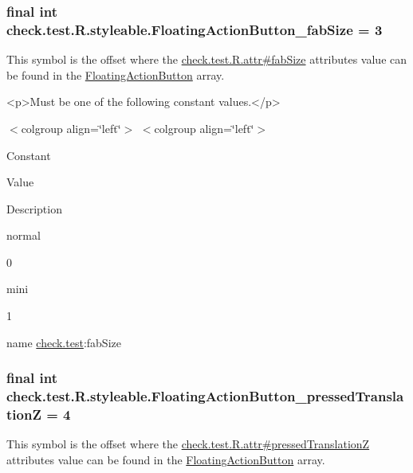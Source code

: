 \subsubsection[{Floating\+Action\+Button\+\_\+fab\+Size}]{\setlength{\rightskip}{0pt plus 5cm}final int check.\+test.\+R.\+styleable.\+Floating\+Action\+Button\+\_\+fab\+Size = 3\hspace{0.3cm}{\ttfamily [static]}}\label{classcheck_1_1test_1_1_r_1_1styleable_a9f7ddd112d179b839c66772f44baf8fc}
This symbol is the offset where the \hyperlink{classcheck_1_1test_1_1_r_1_1attr_af156d88227185ae6207b4c9fd3d86037}{check.\+test.\+R.\+attr\#fab\+Size} attribute\textquotesingle{}s value can be found in the \hyperlink{classcheck_1_1test_1_1_r_1_1styleable_ae6f501c03537511d2edaad8d699781da}{Floating\+Action\+Button} array.

\begin{DoxyVerb}      <p>Must be one of the following constant values.</p>
\end{DoxyVerb}
 \begin{TabularC}{0}
\hline
\end{TabularC}
$<$colgroup align=\char`\"{}left\char`\"{}$>$ $<$colgroup align=\char`\"{}left\char`\"{}$>$ 

Constant

Value

Description 

{\ttfamily normal}

0

{\ttfamily mini}

1

name \hyperlink{namespacecheck_1_1test}{check.\+test}\+:fab\+Size \hypertarget{classcheck_1_1test_1_1_r_1_1styleable_ae7c3b194d0b7e221bd1700bb86de5567}{}
\subsubsection[{Floating\+Action\+Button\+\_\+pressed\+Translation\+Z}]{\setlength{\rightskip}{0pt plus 5cm}final int check.\+test.\+R.\+styleable.\+Floating\+Action\+Button\+\_\+pressed\+Translation\+Z = 4\hspace{0.3cm}{\ttfamily [static]}}\label{classcheck_1_1test_1_1_r_1_1styleable_ae7c3b194d0b7e221bd1700bb86de5567}
This symbol is the offset where the \hyperlink{classcheck_1_1test_1_1_r_1_1attr_a7e7386a063e1333f5af03bd54faff84f}{check.\+test.\+R.\+attr\#pressed\+Translation\+Z} attribute\textquotesingle{}s value can be found in the \hyperlink{classcheck_1_1test_1_1_r_1_1styleable_ae6f501c03537511d2edaad8d699781da}{Floating\+Action\+Button} array.

